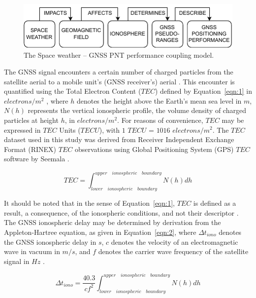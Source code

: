 \let\LaTeXcline\cline\documentclass[sn-mathphys-num]{sn-jnl}\let\cline\LaTeXcline
\begin{document}
\begin{figure}[!ht]
 \centering
 \includegraphics[width=0.89\linewidth]{SpaceWeather-TwoLines.drawio.pdf}
    \caption{The Space weather – GNSS PNT performance coupling model.}
    \label{fig:SpaceWeather}
\end{figure}

The GNSS signal encounters a certain number of charged particles from the satellite aerial to a mobile unit’s (GNSS receiver’s) aerial \cite{schaer1999mapping, prolss2012physics}. This encounter is quantified using the Total Electron Content ($TEC$) defined by Equation~\ref{eqn:1} in $electrons/m^{2}$ \cite{spilker1996global, schaer1999mapping, davies1990ionospheric}, where $h$ denotes the height above the Earth’s mean sea level in $m$, $N(h)$ represents the vertical ionospheric profile, the volume density of charged particles at height $h$, in $electrons/m^{2}$. For reasons of convenience, $TEC$ may be expressed in $TEC$ Units ($TECU$), with $1$ $TECU$ = $1016$ $electrons/m^{2}$. The $TEC$ dataset used in this study was derived from Receiver Independent Exchange Format (RINEX) $TEC$ observations using Global Positioning System (GPS) $TEC$ software by Seemala \cite{SEEMALA202363}.

\begin{equation}
	TEC = \int_{lower \quad ionospheric \quad boundary}^{upper \quad ionospheric \quad boundary}N(h)dh
	\label{eqn:1}
\end{equation}

It should be noted that in the sense of Equation~\ref{eqn:1}, $TEC$ is defined as a result, a consequence, of the ionospheric conditions, and not their descriptor \cite{spilker1996global}. The GNSS ionospheric delay may be determined by derivation from the Appleton-Hartree equation, as given in Equation~\ref{eqn:2}, where $\Delta t_{iono}$ denotes the GNSS ionospheric delay in $s$, $c$ denotes the velocity of an electromagnetic wave in vacuum in $m/s$, and $f$ denotes the carrier wave frequency of the satellite signal in $Hz$ \cite{spilker1996global, schaer1999mapping}.

\begin{equation}
	\Delta t_{iono} = \frac{40.3}{c f^{2}} \int_{lower \quad ionospheric \quad boundary}^{upper \quad ionospheric \quad boundary}N(h)dh
	\label{eqn:2}
\end{equation}
\end{document}
